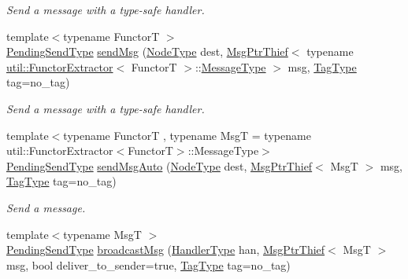 \begin{DoxyCompactItemize}
\begin{DoxyCompactList}\small\item\em Send a message with a type-\/safe handler. \end{DoxyCompactList}\item 
{\footnotesize template$<$typename FunctorT $>$ }\\\hyperlink{structvt_1_1messaging_1_1_active_messenger_a3626a6ca76d8ad4ec7c3b47a2c70d3a8}{Pending\+Send\+Type} \hyperlink{group__functorsend_ga44951ad2da6d9e1eb688d3f730a54db3}{send\+Msg} (\hyperlink{namespacevt_a866da9d0efc19c0a1ce79e9e492f47e2}{Node\+Type} dest, \hyperlink{structvt_1_1messaging_1_1_msg_ptr_thief}{Msg\+Ptr\+Thief}$<$ typename \hyperlink{structvt_1_1util_1_1_functor_extractor}{util\+::\+Functor\+Extractor}$<$ FunctorT $>$\+::\hyperlink{structvt_1_1messaging_1_1_active_messenger_a720a2b1e7462d414b2a51d9fe005eca9}{Message\+Type} $>$ msg, \hyperlink{namespacevt_a84ab281dae04a52a4b243d6bf62d0e52}{Tag\+Type} tag=no\+\_\+tag)
\begin{DoxyCompactList}\small\item\em Send a message with a type-\/safe handler. \end{DoxyCompactList}\item 
{\footnotesize template$<$typename FunctorT , typename MsgT  = typename util\+::\+Functor\+Extractor$<$\+Functor\+T$>$\+::\+Message\+Type$>$ }\\\hyperlink{structvt_1_1messaging_1_1_active_messenger_a3626a6ca76d8ad4ec7c3b47a2c70d3a8}{Pending\+Send\+Type} \hyperlink{group__functorsend_ga902007cdc61f7c93e694b7c4c89d7ee1}{send\+Msg\+Auto} (\hyperlink{namespacevt_a866da9d0efc19c0a1ce79e9e492f47e2}{Node\+Type} dest, \hyperlink{structvt_1_1messaging_1_1_msg_ptr_thief}{Msg\+Ptr\+Thief}$<$ MsgT $>$ msg, \hyperlink{namespacevt_a84ab281dae04a52a4b243d6bf62d0e52}{Tag\+Type} tag=no\+\_\+tag)
\begin{DoxyCompactList}\small\item\em Send a message. \end{DoxyCompactList}\item 
{\footnotesize template$<$typename MsgT $>$ }\\\hyperlink{structvt_1_1messaging_1_1_active_messenger_a3626a6ca76d8ad4ec7c3b47a2c70d3a8}{Pending\+Send\+Type} \hyperlink{group__sendpayload_ga9417950068f8ceed85f1b5ef53f3ad27}{broadcast\+Msg} (\hyperlink{namespacevt_af64846b57dfcaf104da3ef6967917573}{Handler\+Type} han, \hyperlink{structvt_1_1messaging_1_1_msg_ptr_thief}{Msg\+Ptr\+Thief}$<$ MsgT $>$ msg, bool deliver\+\_\+to\+\_\+sender=true, \hyperlink{namespacevt_a84ab281dae04a52a4b243d6bf62d0e52}{Tag\+Type} tag=no\+\_\+tag)

\end{DoxyCompactItemize}
